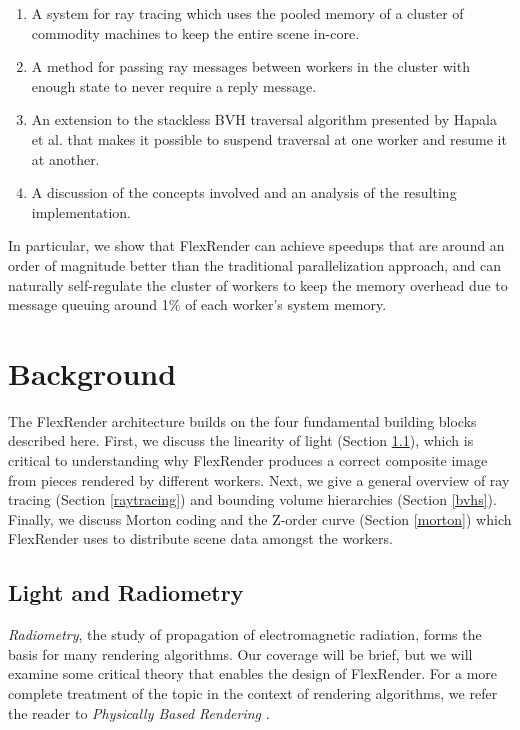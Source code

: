 \documentclass[12pt]{ucthesis}
\begin{document}
\begin{enumerate}
    \item A system for ray tracing which uses the pooled memory of a cluster of
        commodity machines to keep the entire scene in-core.
    \item A method for passing ray messages between workers in the cluster with
        enough state to never require a reply message.
    \item An extension to the stackless BVH traversal algorithm presented by
        Hapala et al. \cite{hapala:2011} that makes it possible to suspend
        traversal at one worker and resume it at another.
    \item A discussion of the concepts involved and an analysis of the resulting
        implementation.
\end{enumerate}

In particular, we show that FlexRender can achieve speedups that are around an
order of magnitude better than the traditional parallelization approach, and can
naturally self-regulate the cluster of workers to keep the memory overhead due
to message queuing around 1\% of each worker's system memory.

\chapter{Background}
\label{background}

The FlexRender architecture builds on the four fundamental building blocks
described here. First, we discuss the linearity of light (Section \ref{radiometry}),
which is critical to understanding why FlexRender produces a correct composite
image from pieces rendered by different workers. Next, we give a general
overview of ray tracing (Section \ref{raytracing}) and bounding volume hierarchies
(Section \ref{bvhs}). Finally, we discuss Morton coding and the Z-order curve
(Section \ref{morton}) which FlexRender uses to distribute scene data amongst the
workers.

\section{Light and Radiometry}
\label{radiometry}

\emph{Radiometry}, the study of propagation of electromagnetic radiation, forms
the basis for many rendering algorithms. Our coverage will be brief, but we will
examine some critical theory that enables the design of FlexRender. For a more
complete treatment of the topic in the context of rendering algorithms, we refer
the reader to \emph{Physically Based Rendering} \cite{pbrt}.
\end{document}
